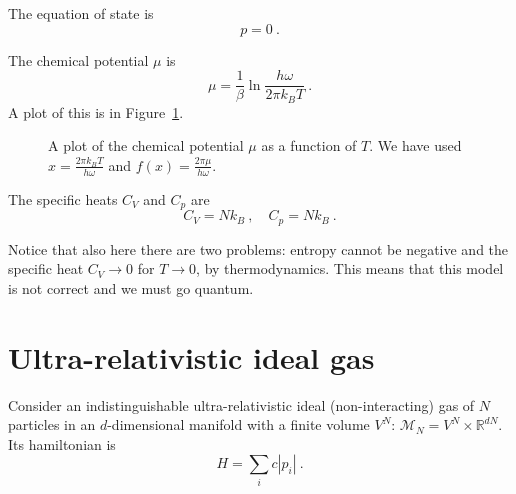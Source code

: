     The equation of state is 
    \begin{equation*}
        p = 0 ~.
    \end{equation*}
    
    The chemical potential $\mu$ is 
    \begin{equation*}
        \mu = \frac{1}{\beta} \ln \frac{h \omega}{2 \pi k_B T} ~.
    \end{equation*}
    A plot of this is in Figure~\ref{can:mu2}.
    \begin{figure}
        \centering
        \caption{A plot of the chemical potential $\mu$ as a function of $T$. We have used $x = \frac{2 \pi k_B T}{h \omega}$ and $f(x) = \frac{2 \pi \mu}{h \omega}$.}
        \label{can:mu2}
    \end{figure}

    The specific heats $C_V$ and $C_p$ are 
    \begin{equation*}
        C_V = N k_B  ~, \quad C_p = N k_B ~. 
    \end{equation*}

    Notice that also here there are two problems: entropy cannot be negative and the specific heat $C_V \rightarrow 0$ for $T \rightarrow 0$, by thermodynamics. This means that this model is not correct and we must go quantum.

\section{Ultra-relativistic ideal gas}

    Consider an indistinguishable ultra-relativistic ideal (non-interacting) gas of $N$ particles in an $d$-dimensional manifold with a finite volume $V^N$: $\mathcal M_N = V^N \times \mathbb R^{dN}$. Its hamiltonian is 
    \begin{equation*}
        H = \sum_i c |p_i| ~.
    \end{equation*}

